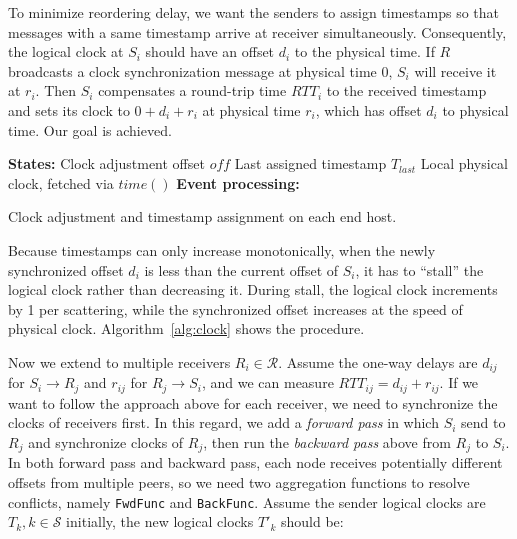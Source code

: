 To minimize reordering delay, we want the senders to assign timestamps so that messages with a same timestamp arrive at receiver simultaneously.
Consequently, the logical clock at $S_i$ should have an offset $d_i$ to the physical time.
If $R$ broadcasts a clock synchronization message at physical time 0, $S_i$ will receive it at $r_i$.
Then $S_i$ compensates a round-trip time $RTT_i$ to the received timestamp and sets its clock to $0 + d_i + r_i$ at physical time $r_i$, which has offset $d_i$ to physical time.
Our goal is achieved.


\begin{algorithm}[t]
 \DontPrintSemicolon
 \textbf{States:} Clock adjustment offset $off$\;
 \qquad Last assigned timestamp $T_{last}$\;
 \qquad Local physical clock, fetched via $time()$\;
 \textbf{Event processing:}\;
 \caption{Clock adjustment and timestamp assignment on each end host.}
 \label{alg:clock}
\end{algorithm}



Because timestamps can only increase monotonically, when the newly synchronized offset $d_i$ is less than the current offset of $S_i$, it has to ``stall'' the logical clock rather than decreasing it.
During stall, the logical clock increments by 1 per scattering, while the synchronized offset increases at the speed of physical clock.
Algorithm~\ref{alg:clock} shows the procedure.

Now we extend to multiple receivers $R_i \in \mathcal{R}$.
Assume the one-way delays are $d_{ij}$ for $S_i \rightarrow R_j$ and $r_{ij}$ for $R_j \rightarrow S_i$, and we can measure $RTT_{ij} = d_{ij} + r_{ij}$.
If we want to follow the approach above for each receiver, we need to synchronize the clocks of receivers first.
In this regard, we add a \textit{forward pass} in which $S_i$ send to $R_j$ and synchronize clocks of $R_j$, then run the \textit{backward pass} above from $R_j$ to $S_i$.
In both forward pass and backward pass, each node receives potentially different offsets from multiple peers, so we need two aggregation functions to resolve conflicts, namely \texttt{FwdFunc} and \texttt{BackFunc}.
Assume the sender logical clocks are $T_k, k \in \mathcal{S}$ initially, the new logical clocks $T'_k$ should be:

